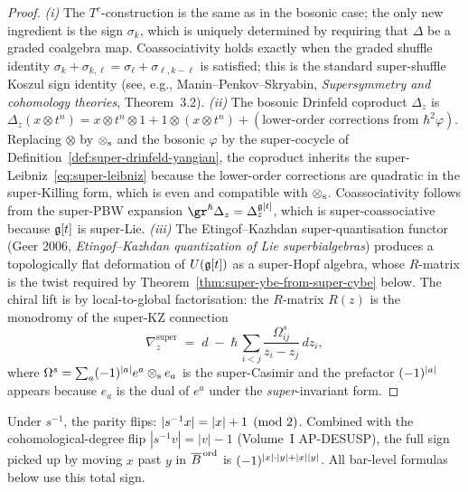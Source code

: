 \begin{proof}
\emph{(i)} The $T^c$-construction is the same as in the bosonic case;
the only new ingredient is the sign $\sigma_k$, which is uniquely determined
by requiring that $\Delta$ be a graded coalgebra map. Coassociativity
holds exactly when the graded shuffle identity
$\sigma_k + \sigma_{k,\ell} = \sigma_\ell + \sigma_{\ell,k-\ell}$ is satisfied;
this is the standard super-shuffle Koszul sign identity (see, e.g.,
Manin--Penkov--Skryabin, \emph{Supersymmetry and cohomology theories},
Theorem~3.2).
\emph{(ii)} The bosonic Drinfeld coproduct $\Delta_z$ is
$\Delta_z(x\otimes t^n) = x\otimes t^n\otimes 1 + 1\otimes(x\otimes t^n) +
 (\text{lower-order corrections from }\hbar^2\varphi)$.
Replacing $\otimes$ by $\mathbin{\otimes_{\mathrm{s}}}$ and the bosonic $\varphi$ by the
super-cocycle of Definition~\ref{def:super-drinfeld-yangian}, the
coproduct inherits the super-Leibniz~\eqref{eq:super-leibniz}
because the lower-order corrections are quadratic in
the super-Killing form, which is even and compatible with $\mathbin{\otimes_{\mathrm{s}}}$.
Coassociativity follows from the super-PBW expansion
$\gr^\hbar \Delta_z = \Delta^{\fg[t]}_z$, which is super-coassociative
because $\mathfrak{g}[t]$ is super-Lie.
\emph{(iii)} The Etingof--Kazhdan super-quantisation functor (Geer 2006,
\emph{Etingof--Kazhdan quantization of Lie superbialgebras}) produces
a topologically flat deformation of $U(\mathfrak{g}[t])$ as a super-Hopf
algebra, whose $R$-matrix is the twist required by
Theorem~\ref{thm:super-ybe-from-super-cybe} below. The chiral
lift is by local-to-global factorisation: the $R$-matrix
$R(z)$ is the monodromy of the super-KZ connection
\[
 \nabla_z^{\mathrm{super}}
 \;=\; d \;-\; \hbar\,\sum_{i<j}\frac{\Omega^s_{ij}}{z_i-z_j}\,dz_i,
\]
where $\Omega^s = \sum_a (-1)^{|a|} e^a\mathbin{\otimes_{\mathrm{s}}} e_a$ is the
super-Casimir and the prefactor $(-1)^{|a|}$ appears because
$e_a$ is the dual of $e^a$ under the \emph{super}-invariant form.
\end{proof}

\begin{remark}
\label{rem:super-desuspension}
Under $s^{-1}$, the parity flips: $|s^{-1}x| = |x|+1
\pmod 2$. Combined with the cohomological-degree flip
$|s^{-1}v|=|v|-1$ (Volume~I AP-DESUSP), the full sign picked up by
moving $x$ past $y$ in $\overline{B}^{\,\mathrm{ord}}$ is
$(-1)^{|x|\cdot|y|+|x||y|}$. All bar-level formulas below
use this total sign.
\end{remark}

